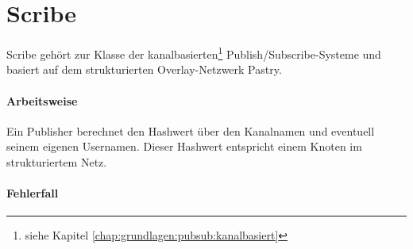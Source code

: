 \section{Scribe}
\label{chap:related:scribe}
Scribe \cite{citeulike:345316} gehört zur Klasse der kanalbasierten\footnote{siehe Kapitel \ref{chap:grundlagen:pubsub:kanalbasiert}} Publish/Subscribe-Systeme und basiert auf dem strukturierten Overlay-Netzwerk Pastry\cite{citeulike:780210}.

\paragraph{Arbeitsweise}
Ein Publisher berechnet den Hashwert über den Kanalnamen und eventuell seinem eigenen Usernamen. Dieser Hashwert entspricht einem Knoten im strukturiertem Netz.

\paragraph{Fehlerfall}
